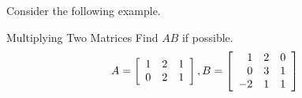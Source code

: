 Consider the following example.

\begin{example}{Multiplying Two Matrices}\label{exa:multiplicationoftwomatrices}
Find $AB$ if possible.
\begin{equation*}
A = \left[
\begin{array}{rrr}
1 & 2 & 1 \\
0 & 2 & 1
\end{array}
\right], B = \left[
\begin{array}{rrr}
1 & 2 & 0 \\
0 & 3 & 1 \\
-2 & 1 & 1
\end{array}
\right]
\end{equation*}
\end{example}

